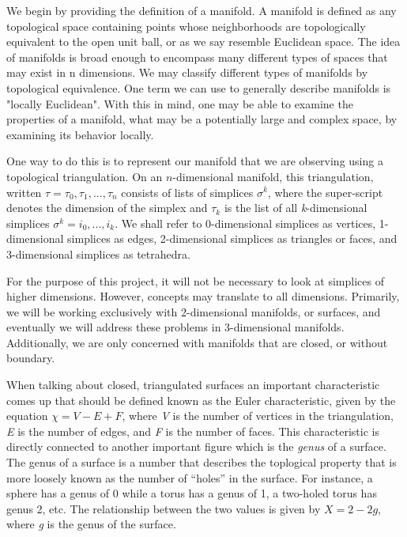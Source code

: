 \documentclass[12pt]{article}
\begin{document}
We begin by providing the definition of a manifold. A manifold is defined as any topological space containing points whose neighborhoods are topologically equivalent to the open unit ball, or as we say resemble Euclidean space. The idea of manifolds is broad enough to encompass many different types of spaces that may exist in n dimensions. We may classify different types of manifolds by topological equivalence. One term we can use to generally describe manifolds is "locally Euclidean". With this in mind, one may be able to examine the properties of a manifold, what may be a potentially large and complex space, by examining its behavior locally.\newline

\noindent One way to do this is to represent our manifold that we are observing using a topological triangulation. On an $n$-dimensional manifold, this triangulation, written $\tau = {\tau_0, \tau_1, ... , \tau_n}$ consists of lists of simplices $\sigma^k$, where the super-script denotes the dimension of the simplex and $\tau_k$ is the list of all \textit{k}-dimensional simplices $\sigma^k = {i_0, ... , i_k}$. We shall refer to 0-dimensional simplices as vertices, 1-dimensional simplices as edges, 2-dimensional simplices as triangles or faces, and 3-dimensional simplices as tetrahedra.\newline

\noindent For the purpose of this project, it will not be necessary to look at simplices of higher dimensions. However, concepts may translate to all dimensions. Primarily, we will be working exclusively with 2-dimensional manifolds, or surfaces, and eventually we will address these problems in 3-dimensional manifolds. Additionally, we are only concerned with manifolds that are closed, or without boundary. \newline

\noindent When talking about closed, triangulated surfaces an important characteristic comes up that should be defined known as the Euler characteristic, given by the equation $\chi = V - E + F$, where \textit{V} is the number of vertices in the triangulation, \textit{E} is the number of edges, and \textit{F} is the number of faces. This characteristic is directly connected to another important figure which is the \textit{genus} of a surface. The genus of a surface is a number that describes the toplogical property that is more loosely known as the number of ``holes'' in the surface. For instance, a sphere has a genus of 0 while a torus has a genus of 1, a two-holed torus has genus 2, etc. The relationship between the two values is given by $X = 2 - 2g$, where \textit{g} is the genus of the surface. 
\end{document}
